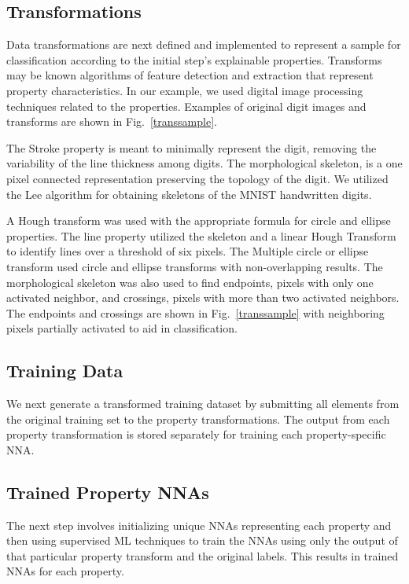 \documentclass[conference]{IEEEtran}
\begin{document}
\subsection{Transformations}
Data transformations are next defined and implemented to represent a sample for classification according to the initial step's explainable properties.  Transforms may be known algorithms of feature detection and extraction that represent property characteristics.  In our example, we used digital image processing techniques related to the properties.  Examples of original digit images and transforms are shown in Fig.~\ref{transsample}.

The Stroke property is meant to minimally represent the digit, removing the variability of the line thickness among digits.  The morphological skeleton, is a one pixel connected representation preserving the topology of the digit.  We utilized the Lee\cite{Lee1994} algorithm for obtaining skeletons of the MNIST handwritten digits.

A Hough transform was used with the appropriate formula for circle and ellipse properties.  The line property utilized the skeleton and a linear Hough Transform to identify lines over a threshold of six pixels.  The Multiple circle or ellipse transform used circle and ellipse transforms with non-overlapping results.  The morphological skeleton was also used to find endpoints, pixels with only one activated neighbor, and crossings, pixels with more than two activated neighbors.   The endpoints and crossings are shown in Fig.~\ref{transsample} with neighboring pixels partially activated to aid in classification.

\subsection{Training Data} 
We next generate a transformed training dataset by submitting all elements from the original training set to the property transformations.  The output from each property transformation is stored separately for training each property-specific NNA. 

\subsection{Trained Property NNAs}
The next step involves initializing unique NNAs representing each property and then using supervised ML techniques to train the NNAs using only the output of that particular property transform and the original labels.  This results in trained NNAs for each property.
\end{document}
